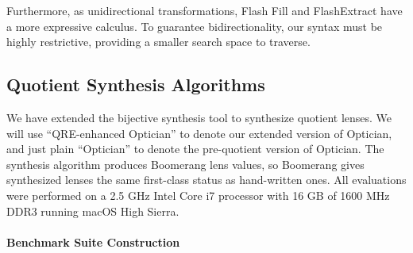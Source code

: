 \documentclass[12pt]{article}
\begin{document}
{Furthermore, as unidirectional transformations, Flash Fill and FlashExtract have
a more expressive calculus.  To guarantee bidirectionality, our syntax must be
highly restrictive, providing a smaller search space to traverse.

\subsection{Quotient Synthesis Algorithms}


\newcommand{\wf}[1]{\ensuremath{#1\;\mathsf{wf}}}

\newcommand{\re}[1]{\ensuremath{\mathtt{#1}}}
\newcommand{\codefont}[1]{\ensuremath{\mathsf{#1}}}
\newcommand{\kw}[1]{\textcolor{dkblue}{\ensuremath{\mathsf{#1}}}}
\newcommand{\collapse}[2]{\ensuremath{\kw{collapse} \; #1 \mapsto #2}}
\newcommand{\squash}[3]{\ensuremath{\kw{squash} \; #1 \rightarrow #2\; \kw{using} \; #3}}
\newcommand{\perm}[2]{\ensuremath{\kw{perm}(#1)\; \kw{with}\; #2}}
\newcommand{\normalize}[3]{\ensuremath{\kw{normalize}(#1, #2, #3)}}
\newcommand{\eqrel}[1]{\ensuremath{\equiv_{#1}}}

\newcommand{\canonize}{\ensuremath{\kw{canonize}}}

\newcommand{\Name}{Optometrist\xspace}

\newcommand{\QRESize}{\textbf{QS}}
\newcommand{\canonizeAndSpecSize}{\textbf{BS}}
\newcommand{\LensAndSpecSize}{\textbf{NS}}

\newcommand{\QOpt}{QRE-enhanced Optician}
\newcommand{\OpticianRuntime}{\textbf{Optician}}
\newcommand{\QREOptician}{\textbf{Optician\textsubscript{Q}}}
\newcommand{\SystemOnOptician}{\textbf{QO}}
\newcommand{\SystemOnBenchmarks}{\textbf{QQ}}
\newcommand{\cd}[1]{\lstinline[backgroundcolor=\color{white}]$#1$}

We have extended the bijective synthesis tool to synthesize quotient lenses. We will use 
``\QOpt'' to denote our extended version of Optician, and just plain ``Optician'' to denote
the pre-quotient version of Optician. The synthesis algorithm produces Boomerang lens
values, so Boomerang gives synthesized lenses the same first-class status as hand-written ones. 
%
All evaluations were performed on a 2.5 GHz Intel Core i7 processor with 16 GB
of 1600 MHz DDR3 running macOS High Sierra.


\paragraph*{Benchmark Suite Construction}

}
\end{document}
